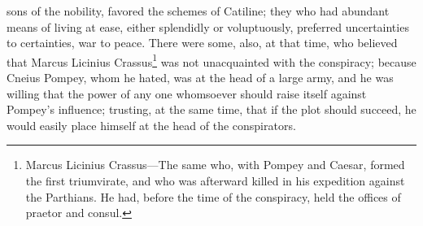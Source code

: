 sons of the nobility, favored the schemes of Catiline; they who had
abundant means of living at ease, either splendidly or voluptuously,
preferred uncertainties to certainties, war to peace. There were some,
also, at that time, who believed that Marcus Licinius Crassus\footnote{Marcus Licinius Crassus—The same who, with Pompey and Caesar,
formed the first triumvirate, and who was afterward killed in his
expedition against the Parthians. He had, before the time of the
conspiracy, held the offices of praetor and consul.} was
not unacquainted with the conspiracy; because Cneius Pompey, whom he
hated, was at the head of a large army, and he was willing that the
power of any one whomsoever should raise itself against Pompey's
influence; trusting, at the same time, that if the plot should
succeed, he would easily place himself at the head of the
conspirators.

